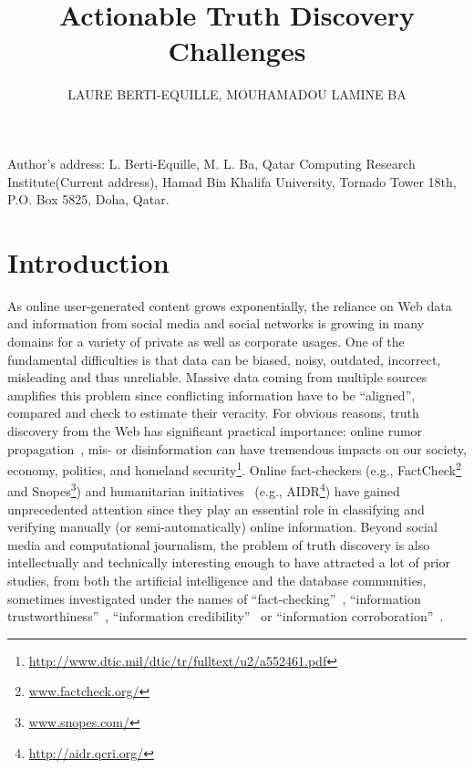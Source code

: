 \documentclass[prodmode,acmtecs]{acmsmall} %
\begin{document}
\title{Actionable Truth Discovery Challenges}
\author{LAURE BERTI-EQUILLE, MOUHAMADOU LAMINE BA
}



\begin{bottomstuff}
Author's address: L. Berti-Equille, M. L. Ba, Qatar Computing Research Institute(Current address), Hamad
Bin Khalifa University, Tornado Tower 18th, P.O. Box 5825, Doha, Qatar.
\end{bottomstuff}

\maketitle


\section{Introduction}
As online user-generated content grows exponentially, the reliance on Web data and information from social 
media and social networks is growing in many domains for a variety of private as well as corporate usages. 
One of the fundamental difficulties is that data can be biased, noisy, outdated, incorrect, misleading and
thus unreliable. Massive data coming from multiple sources amplifies this problem since conflicting information
have to be ``aligned'', compared  and check to estimate their veracity. For obvious reasons, truth discovery from 
the Web has significant practical importance: online rumor propagation~\cite{rumor-icdm2013}, mis- or disinformation
can have tremendous impacts on our society, economy, politics, and homeland security\footnote{\url{http://www.dtic.mil/dtic/tr/fulltext/u2/a552461.pdf}}. 
Online fact-checkers (e.g., FactCheck\footnote{\url{www.factcheck.org/}} and Snopes\footnote{\url{www.snopes.com/}}) and humanitarian initiatives~\cite{ImranECDM13}
(e.g., AIDR\footnote{\scriptsize{\url{http://aidr.qcri.org/}}}) have gained unprecedented attention since they play an essential role in classifying and verifying  manually (or semi-automatically) online information.
Beyond social media and computational journalism, the problem of truth discovery is also intellectually and technically interesting enough to have attracted a lot of prior studies, from both the artificial 
intelligence and the database communities, sometimes investigated under the names of  ``fact-checking''~\cite{GoasdoueKKLMZ13}, ``information trustworthiness''~\cite{Thirunarayan2014182}, ``information credibility''~\cite{PasternackR13} or ``information corroboration''~\cite{GallandAMS10}. 
\end{document}
